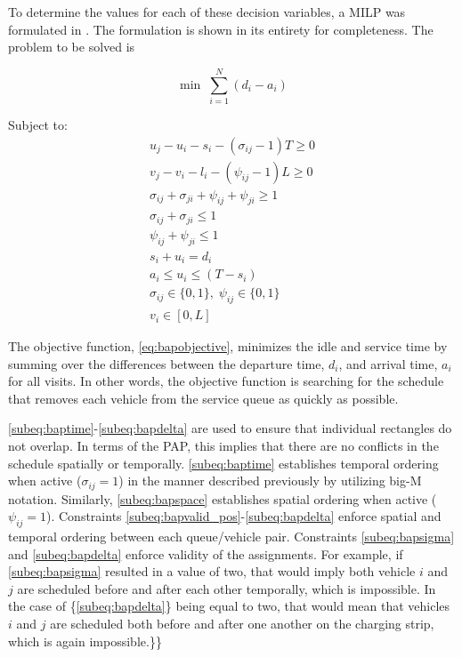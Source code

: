 \documentclass[ee,thesis]{usuthesis}
\begin{document}
To determine the values for each of these decision variables, a MILP was formulated in
\cite{qarebagh-2019-optim-sched}. The formulation is shown in its entirety for completeness.
The problem to be solved is

\begin{equation}
	\label{eq:bapobjective}
	\min\; \sum_{i=1}^N (d_i - a_i)
\end{equation}

Subject to:
\begin{subequations}
\label{eq:bapconstrs}
\begin{align}
    u_j - u_i - s_i - (\sigma_{ij} - 1)T \geq 0   \label{subeq:baptime}          \\
    v_j - v_i - l_i - (\psi_{ij} - 1)L \geq 0   \label{subeq:bapspace}           \\
    \sigma_{ij} + \sigma_{ji} + \psi_{ij} + \psi_{ji} \geq 1 \label{subeq:bapvalid_pos}     \\
    \sigma_{ij} + \sigma_{ji} \leq 1                   \label{subeq:bapsigma}        \\
    \psi_{ij} + \psi_{ji} \leq 1                   \label{subeq:bapdelta}        \\
    s_i + u_i = d_i                       \label{subeq:bapdetach}       \\
    a_i \leq u_i \leq (T - s_i)                 \label{subeq:bapvalid_starts} \\
    \sigma_{ij} \in \{0,1\},\;\psi_{ij} \in \{0,1\}\; \label{subeq:bapsdspace}      \\
    v_i \in [0, L ]                         \label{subeq:bapvspace}
\end{align}
\end{subequations}

\noindent The objective function, \autoref{eq:bapobjective}, minimizes the idle and service time by summing over the
differences between the departure time, \(d_i\), and arrival time, \(a_i\) for all visits. In other words, the objective
function is searching for the schedule that removes each vehicle from the service queue as quickly as possible.

\autoref{subeq:baptime}-\autoref{subeq:bapdelta} are used to ensure that individual rectangles do not overlap. In terms
of the PAP, this implies that there are no conflicts in the schedule spatially or temporally. \autoref{subeq:baptime}
establishes temporal ordering when active (\(\sigma_{ij}=1\)) in the manner described previously by utilizing big-M notation.
Similarly, \autoref{subeq:bapspace} establishes spatial ordering when active (\(\psi_{ij} =1\)). Constraints
\autoref{subeq:bapvalid_pos}-\autoref{subeq:bapdelta} enforce spatial and temporal ordering between each queue/vehicle
pair. Constraints \autoref{subeq:bapsigma} and \autoref{subeq:bapdelta} enforce validity of the assignments. For
example, if \autoref{subeq:bapsigma} resulted in a value of two, that would imply both vehicle \(i\) and \(j\) are scheduled
before and after each other temporally, which is impossible. In the case of \{\autoref{subeq:bapdelta}\} being equal to
two, that would mean that vehicles \(i\) and \(j\) are scheduled both before and after one another on the charging strip,
which is again impossible.\}\}
\end{document}
